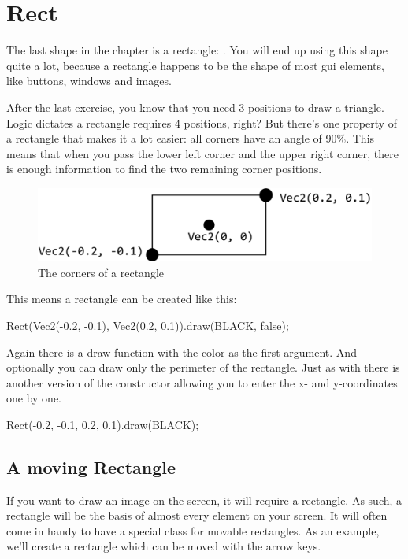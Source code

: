 \section{Rect}
The last shape in the chapter is a rectangle: . You will end up using this shape quite a lot, because a rectangle happens to be the shape of most gui elements, like buttons, windows and images.

After the last exercise, you know that you need 3 positions to draw a triangle. Logic dictates a rectangle requires 4 positions, right? But there's one property of a rectangle that makes it a lot easier: all corners have an angle of 90\%. This means that when you pass the lower left corner and the upper right corner, there is enough information to find the two remaining corner positions.

\begin{figure}[h]
\centering
\includegraphics[width=0.8\linewidth]{images/rectangle.png}
\caption[]{The corners of a rectangle}
\label{fig:rect}
\end{figure}

This means a rectangle can be created like this:

\begin{code}
Rect(Vec2(-0.2, -0.1), Vec2(0.2, 0.1)).draw(BLACK, false);
\end{code}

Again there is a draw function with the color as the first argument. And optionally you can draw only the perimeter of the rectangle. Just as with  there is another version of the constructor allowing you to enter the x- and y-coordinates one by one.

\begin{code}
Rect(-0.2, -0.1, 0.2, 0.1).draw(BLACK);
\end{code}

\subsection{A moving Rectangle}
If you want to draw an image on the screen, it will require a rectangle. As such, a rectangle will be the basis of almost every element on your screen. It will often come in handy to have a special class for movable rectangles. As an example, we'll create a rectangle which can be moved with the arrow keys.


